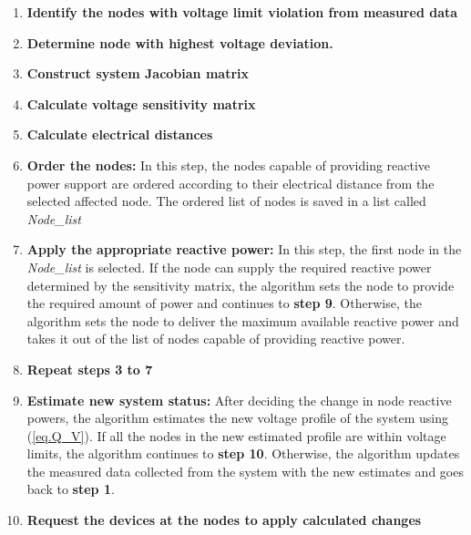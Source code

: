 \begin{enumerate}
\item \textbf{Identify the nodes with voltage limit violation from measured data}
\item \textbf{Determine node with highest voltage deviation.}
\item \textbf{Construct system Jacobian matrix}
\item \textbf{Calculate voltage sensitivity matrix}
\item \textbf{Calculate electrical distances}
\item \textbf{Order the nodes:} In this step, the nodes capable of providing reactive power support are ordered according to their electrical distance from the selected affected node. The ordered list of nodes is saved in a list called \textit{Node\_list}
\item \textbf{Apply the appropriate reactive power:} In this step, the first node in the \textit{Node\_list} is selected. If the node can supply the required reactive power determined by the sensitivity matrix, the algorithm sets the node to provide the required amount of power and continues to \textbf{step 9}. Otherwise, the algorithm sets the node to deliver the maximum available reactive power and takes it out of the list of nodes capable of providing reactive power.
\item \textbf{Repeat steps 3 to 7}
\item \textbf{Estimate new system status:} After deciding the change in node reactive powers, the algorithm estimates the new voltage profile of the system using (\ref{eq.Q_V}). If all the nodes in the new estimated profile are within voltage limits, the algorithm continues to \textbf{step 10}. Otherwise, the algorithm updates the measured data collected from the system with the new estimates and goes back to  \textbf{step 1}.

\item \textbf{Request the devices at the nodes to apply calculated changes}
\end{enumerate}



